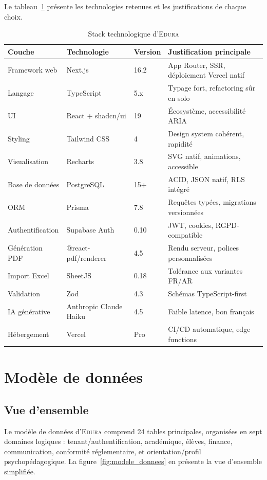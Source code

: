 \documentclass[12pt,a4paper,oneside]{report}
\newcommand{\edura}{\textsc{Edura}}
\begin{document}
Le tableau~\ref{tab:stack} présente les technologies retenues et les justifications de chaque choix.

\begin{table}[H]
\centering
\caption{Stack technologique d'\edura{}}
\label{tab:stack}
\begin{tabularx}{\textwidth}{lllX}
\toprule
\textbf{Couche} & \textbf{Technologie} & \textbf{Version} & \textbf{Justification principale} \\
\midrule
Framework web & Next.js & 16.2 & App Router, SSR, déploiement Vercel natif \\
Langage & TypeScript & 5.x & Typage fort, refactoring sûr en solo \\
UI & React + shadcn/ui & 19 & Écosystème, accessibilité ARIA \\
Styling & Tailwind CSS & 4 & Design system cohérent, rapidité \\
Visualisation & Recharts & 3.8 & SVG natif, animations, accessible \\
Base de données & PostgreSQL & 15+ & ACID, JSON natif, RLS intégré \\
ORM & Prisma & 7.8 & Requêtes typées, migrations versionnées \\
Authentification & Supabase Auth & 0.10 & JWT, cookies, RGPD-compatible \\
Génération PDF & @react-pdf/renderer & 4.5 & Rendu serveur, polices personnalisées \\
Import Excel & SheetJS & 0.18 & Tolérance aux variantes FR/AR \\
Validation & Zod & 4.3 & Schémas TypeScript-first \\
IA générative & Anthropic Claude Haiku & 4.5 & Faible latence, bon français \\
Hébergement & Vercel & Pro & CI/CD automatique, edge functions \\
\bottomrule
\end{tabularx}
\end{table}

\section{Modèle de données}

\subsection{Vue d'ensemble}

Le modèle de données d'\edura{} comprend 24 tables principales, organisées en sept domaines logiques : tenant/authentification, académique, élèves, finance, communication, conformité réglementaire, et orientation/profil psychopédagogique. La figure~\ref{fig:modele_donnees} en présente la vue d'ensemble simplifiée.
\end{document}
